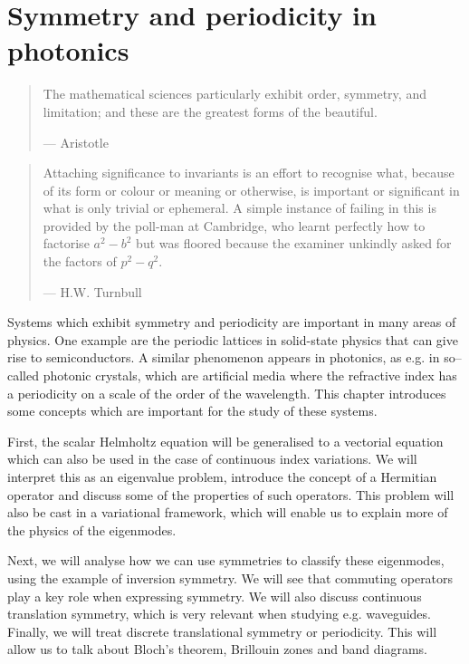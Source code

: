 \chapter{Symmetry and periodicity in photonics}
\label{h:periodic}

\begin{quote}
The mathematical sciences particularly exhibit order, symmetry, and limitation; and these are the greatest forms of the beautiful.

--- Aristotle
\end{quote}

\begin{quote}
Attaching significance to invariants is an effort to recognise what, because of its form or colour or meaning or otherwise, is important or significant in what is only trivial or ephemeral. A simple instance of failing in this is provided by the poll-man at Cambridge, who learnt perfectly how to factorise $a^2 - b^2$ but was floored because the examiner unkindly asked for the factors of $p^2 - q^2$.

--- H.W. Turnbull
\end{quote}

\chaptertoc

Systems which exhibit symmetry and periodicity are important in many areas of physics. One example are the periodic lattices in solid-state physics that can give rise to semiconductors. A similar phenomenon appears in photonics, as e.g. in so--called photonic crystals, which are artificial media where the refractive index has a periodicity on a scale of the order of the wavelength. This chapter introduces some concepts which are important for the study of these systems.

First, the scalar Helmholtz equation will be generalised to a vectorial equation which can also be used in the case of continuous index variations. We will interpret this as an eigenvalue problem, introduce the concept of a Hermitian operator and discuss some of the properties of such operators. This problem will also be cast in a variational framework, which will enable us to explain more of the physics of the eigenmodes.

Next, we will analyse how we can use symmetries to classify these eigenmodes, using the example of inversion symmetry. We will see that commuting operators play a key role when expressing symmetry. We will also discuss continuous translation symmetry, which is very relevant when studying e.g. waveguides. Finally, we will treat discrete translational symmetry or periodicity. This will allow us to talk about Bloch's theorem, Brillouin zones and band diagrams. 


